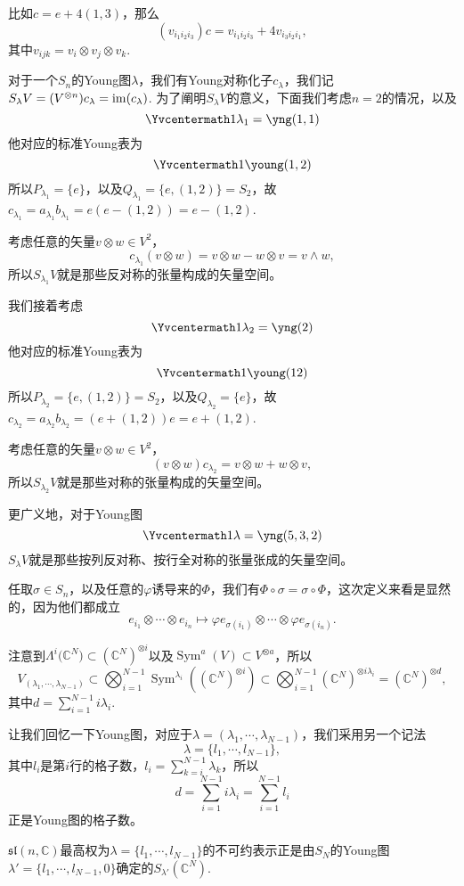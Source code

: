 \documentclass[10pt]{article}
\newcommand{\cc}{\mathbb{C}}
\DeclareMathOperator{\sym}{Sym}
\begin{document}
比如$c=e+4(1,3)$，那么
\[
	(v_{i_1i_2i_3})c=v_{i_1i_2i_3}+4v_{i_3i_2i_1},
\]
其中$v_{ijk}=v_{i}\otimes v_{j}\otimes v_{k}$.

\para 对于一个$S_n$的Young图$\lambda$，我们有Young对称化子$c_\lambda$，我们记$S_\lambda V= (V^{\otimes n})c_\lambda=\operatorname{im}(c_\lambda)$. 为了阐明$S_\lambda V$的意义，下面我们考虑$n=2$的情况，以及
\[\Yvcentermath1
	\lambda_1=\yng(1,1)
\]
他对应的标准Young表为
\[\Yvcentermath1
	\young(1,2)
\]
所以$P_{\lambda_1}=\{e\}$，以及$Q_{\lambda_1}=\{e,(1,2)\}=S_2$，故$c_{\lambda_1}=a_{\lambda_1} b_{\lambda_1} =e (e- (1,2))=e- (1,2)$.

考虑任意的矢量$v\otimes w\in V^2$，
\[
c_{\lambda_1}(v\otimes w)=v\otimes w-w\otimes v=v\wedge w,
\]
所以$S_{\lambda_1} V$就是那些反对称的张量构成的矢量空间。

我们接着考虑
\[\Yvcentermath1
	\lambda_2=\yng(2)
\]
他对应的标准Young表为
\[\Yvcentermath1
	\young(12)
\]
所以$P_{\lambda_2}=\{e,(1,2)\}=S_2$，以及$Q_{\lambda_2}=\{e\}$，故$c_{\lambda_2}=a_{\lambda_2} b_{\lambda_2} =(e+(1,2))e =e+(1,2)$.

考虑任意的矢量$v\otimes w\in V^2$，
\[
(v\otimes w)c_{\lambda_2}=v\otimes w+w\otimes v,
\]
所以$S_{\lambda_2} V$就是那些对称的张量构成的矢量空间。

更广义地，对于Young图
\[\Yvcentermath1
	\lambda=\yng(5,3,2)
\]
$S_{\lambda} V$就是那些按列反对称、按行全对称的张量张成的矢量空间。

\para 任取$\sigma\in S_n$，以及任意的$\varphi$诱导来的$\Phi$，我们有$\Phi\circ \sigma=\sigma\circ \Phi$，这次定义来看是显然的，因为他们都成立
\[
	e_{i_1}\otimes\cdots\otimes e_{i_n}\mapsto \varphi e_{\sigma(i_1)}\otimes\cdots\otimes \varphi e_{\sigma(i_n)}.
\]

\para 注意到$\Lambda^i\bigl(\cc^N\bigr)\subset (\cc^N)^{\otimes i}$以及$\sym^a(V)\subset V^{\otimes a}$，所以
\[
	V_{(\lambda_1,\cdots,\lambda_{N-1})}\subset \bigotimes_{i=1}^{N-1}\sym^{\lambda_i}\left((\cc^N)^{\otimes i}\right)\subset  \bigotimes_{i=1}^{N-1}(\cc^N)^{\otimes i\lambda_i}=(\cc^N)^{\otimes d},
\]
其中$d=\sum_{i=1}^{N-1}i\lambda_i$. 

让我们回忆一下Young图，对应于$\lambda=(\lambda_1,\cdots, \lambda_{N-1})$，我们采用另一个记法
\[
	\lambda=\{l_1,\cdots,l_{N-1}\},
\]
其中$l_i$是第$i$行的格子数，$l_i=\sum_{k=i}^{N-1}\lambda_k$，所以
\[
	d=\sum_{i=1}^{N-1}i\lambda_i=\sum_{i=1}^{N-1}l_i
\]
正是Young图的格子数。

\theo $\mathfrak{sl}(n,\cc)$最高权为$\lambda=\{l_1,\cdots,l_{N-1}\}$的不可约表示正是由$S_N$的Young图$\lambda'=\{l_1,\cdots,l_{N-1},0\}$确定的$S_{\lambda'} (\cc^N)$.
\end{document}
